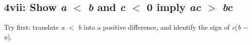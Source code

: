 \documentclass[11pt]{article}
\begin{document}
\begin{keepsection}
\begin{keepsection}
\subsection{4vii: Show \textit{a} \ensuremath{<} \textit{b} and \textit{c} \ensuremath{<} 0 imply \textit{a}\textit{c} \ensuremath{>} \textit{b}\textit{c}}

Try first: translate \textit{a} \ensuremath{<} \textit{b} into a positive difference, and identify the sign of \textit{c}(\textit{b} \ensuremath{-} \textit{a}).

\end{keepsection}
\end{keepsection}
\end{document}
